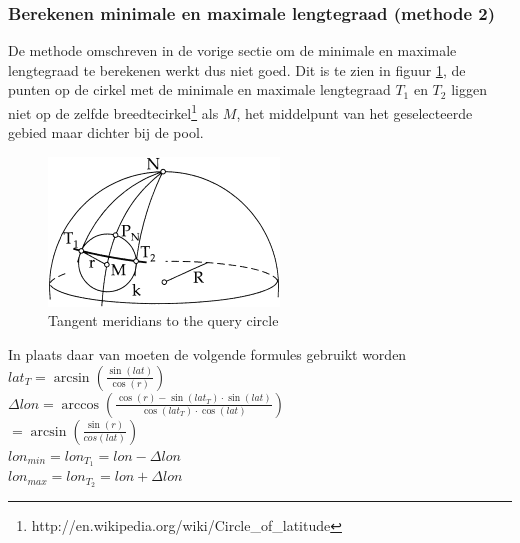 \documentclass[twoside,openright]{uva-bachelor-thesis}
\begin{document}
		\subsubsection{Berekenen minimale en maximale lengtegraad (methode 2)}
		De methode omschreven in de vorige sectie om de minimale en maximale lengtegraad te berekenen werkt dus niet goed. Dit is te zien in figuur \ref{fig:tangentpoints}, de punten op de cirkel met de minimale en maximale lengtegraad $T_1$ en $T_2$ liggen niet op de zelfde breedtecirkel\footnote{http://en.wikipedia.org/wiki/Circle\_of\_latitude} als $M$, het middelpunt van het geselecteerde gebied maar dichter bij de pool.
		\begin{figure}[!htb]
			\centering
			\includegraphics[scale=1.0]{./img/TangentPoints.png}
			\caption{Tangent meridians to the query circle}
			\label{fig:tangentpoints}
		\end{figure}
		\newpage
		In plaats daar van moeten de volgende formules gebruikt worden
		\\[0.5cm]
		$lat_T = \arcsin(\frac{\sin(lat)}{\cos(r)})$\\
		$\Delta lon = \arccos(\frac{\cos(r) - \sin(lat_T) \cdot \sin(lat)}{\cos(lat_T) \cdot \cos(lat)})$ \\
		$= \arcsin(\frac{\sin(r)}{cos(lat)})$
		\\[0.5cm]
		$lon_{min} = lon_{T_1} = lon - \Delta lon$\\
		$lon_{max} = lon_{T_2} = lon + \Delta lon$
\end{document}
